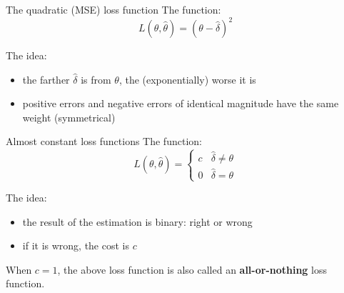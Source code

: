 \documentclass[11pt]{beamer}
\begin{document}
\begin{frame}{The quadratic (MSE) loss function}
The function:
\begin{equation}
L(\theta,\hat{\theta})=(\theta-\hat{\delta})^2
\end{equation}

The idea:
\begin{itemize}
\item the farther $\hat{\delta}$ is from $\theta$, the (exponentially) worse it is
\item positive errors and negative errors of identical magnitude have the same weight (symmetrical)
\end{itemize}



\end{frame}
\begin{frame}{Almost constant loss functions}
The function:
\begin{equation}
L(\theta,\hat{\theta})= \left\{
\begin{array}{cc}
c & \hat{\delta} \neq \theta \\
0 & \hat{\delta} = \theta
\end{array}
\right.
\end{equation}

The idea:
\begin{itemize}
\item the result of the estimation is binary: right or wrong
\item if it is wrong, the cost is $c$
\end{itemize}

When $c=1$, the above loss function is also called an \textbf{all-or-nothing} loss function.

\end{frame}
\end{document}
